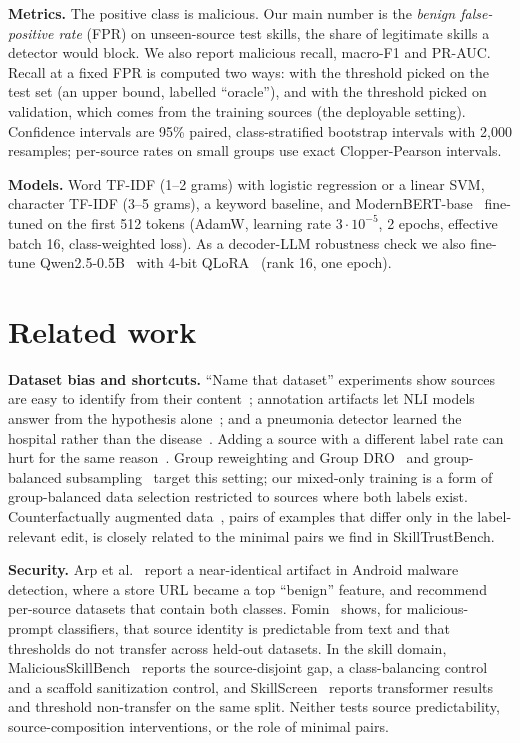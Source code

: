 \documentclass[conference]{IEEEtran}
\begin{document}
\textbf{Metrics.} The positive class is malicious. Our main number is the \emph{benign false-positive rate}
(FPR) on unseen-source test skills, the share of legitimate skills a detector would block. We also report
malicious recall, macro-F1 and PR-AUC. Recall at a fixed FPR is computed two ways: with the threshold picked
on the test set (an upper bound, labelled ``oracle''), and with the threshold picked on validation, which
comes from the training sources (the deployable setting). Confidence intervals are 95\% paired,
class-stratified bootstrap intervals with 2,000 resamples; per-source rates on small groups use exact
Clopper-Pearson intervals.

\textbf{Models.} Word TF-IDF (1--2 grams) with logistic regression or a linear SVM, character TF-IDF (3--5
grams), a keyword baseline, and ModernBERT-base~\cite{modernbert2024} fine-tuned on the first 512 tokens
(AdamW, learning rate $3\cdot10^{-5}$, 2 epochs, effective batch 16, class-weighted loss). As a
decoder-LLM robustness check we also fine-tune Qwen2.5-0.5B~\cite{qwen25} with 4-bit
QLoRA~\cite{dettmers2023} (rank 16, one epoch).





\section{Related work}
\textbf{Dataset bias and shortcuts.} ``Name that dataset'' experiments show sources are easy to identify from
their content~\cite{torralba2011,liu2025decade}; annotation artifacts let NLI models answer from the hypothesis
alone~\cite{gururangan2018}; and a pneumonia detector learned the hospital rather than the
disease~\cite{zech2018}. Adding a source with a different label rate can hurt for the same
reason~\cite{compton2023}. Group reweighting and Group DRO~\cite{sagawa2020} and group-balanced
subsampling~\cite{idrissi2022} target this setting; our mixed-only training is a form of group-balanced data
selection restricted to sources where both labels exist. Counterfactually augmented data~\cite{kaushik2020},
pairs of examples that differ only in the label-relevant edit, is closely related to the minimal pairs we
find in SkillTrustBench.

\textbf{Security.} Arp et al.~\cite{arp2022} report a near-identical artifact in Android malware detection,
where a store URL became a top ``benign'' feature, and recommend per-source datasets that contain both
classes. Fomin~\cite{fomin2026} shows, for malicious-prompt classifiers, that source identity is predictable
from text and that thresholds do not transfer across held-out datasets. In the skill domain,
MaliciousSkillBench~\cite{msb2026} reports the source-disjoint gap, a class-balancing control and a scaffold
sanitization control, and SkillScreen~\cite{skillscreen2026} reports transformer results and threshold
non-transfer on the same split. Neither tests source predictability, source-composition interventions, or
the role of minimal pairs.
\end{document}
